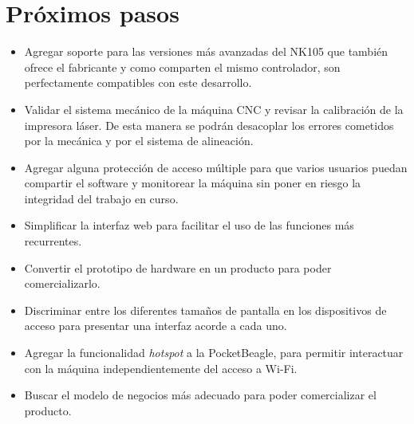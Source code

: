 \section{Próximos pasos}

\begin{itemize}
\item{Agregar soporte para las versiones más avanzadas del NK105 que también ofrece el fabricante y como comparten el mismo controlador, son perfectamente compatibles con este desarrollo.}
\item{Validar el sistema mecánico de la máquina CNC y revisar la calibración de la impresora láser. De esta manera se podrán desacoplar los errores cometidos por la mecánica y por el sistema de alineación.}

\item{Agregar alguna protección de acceso múltiple para que varios usuarios puedan compartir el software y monitorear la máquina sin poner en riesgo la integridad del trabajo en curso.}

\item{Simplificar la interfaz web para facilitar el uso de las funciones más recurrentes.}
\item{Convertir el prototipo de hardware en un producto para poder comercializarlo.}
\item{Discriminar entre los diferentes tamaños de pantalla en los dispositivos de acceso para presentar una interfaz acorde a cada uno.}
\item{Agregar la funcionalidad \textit{hotspot} a la PocketBeagle, para permitir interactuar con la máquina independientemente del acceso a Wi-Fi.}
\item{Buscar el modelo de negocios más adecuado para poder comercializar el producto.}
\end{itemize}
